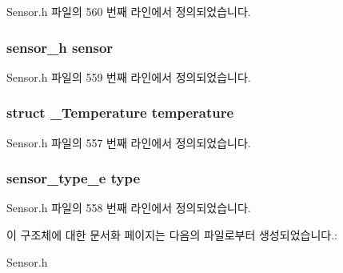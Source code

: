 Sensor.\-h 파일의 560 번째 라인에서 정의되었습니다.

\hypertarget{struct___temperature_extend_a5bae9b7801bc3808411925cde81d3f26}{
\subsubsection[{sensor}]{\setlength{\rightskip}{0pt plus 5cm}sensor\-\_\-h sensor}}\label{struct___temperature_extend_a5bae9b7801bc3808411925cde81d3f26}


Sensor.\-h 파일의 559 번째 라인에서 정의되었습니다.

\hypertarget{struct___temperature_extend_ae174a42339036c716d64258eab61d521}{
\subsubsection[{temperature}]{\setlength{\rightskip}{0pt plus 5cm}struct {\bf \-\_\-\-Temperature} temperature}}\label{struct___temperature_extend_ae174a42339036c716d64258eab61d521}


Sensor.\-h 파일의 557 번째 라인에서 정의되었습니다.

\hypertarget{struct___temperature_extend_abffb09766da2fc510a79bb51f82a36e1}{
\subsubsection[{type}]{\setlength{\rightskip}{0pt plus 5cm}sensor\-\_\-type\-\_\-e type}}\label{struct___temperature_extend_abffb09766da2fc510a79bb51f82a36e1}


Sensor.\-h 파일의 558 번째 라인에서 정의되었습니다.



이 구조체에 대한 문서화 페이지는 다음의 파일로부터 생성되었습니다.\-:\begin{DoxyCompactItemize}
\item 
Sensor.\-h\end{DoxyCompactItemize}
